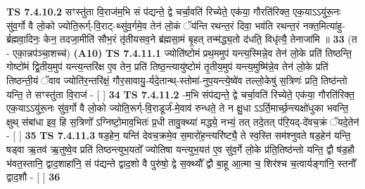 \documentclass[17pt]{extarticle}
\begin{document}
                  \newline
                                \textbf{ TS 7.4.10.2} \newline
                  सꣳस्तु॑ता वि॒राज॑म॒भि सं प॑द्यन्ते॒ द्वे चर्चा॒वति॑ रिच्येते॒ एक॑या॒ गौरति॑रिक्त॒ एक॒याऽऽयु॑रू॒नः सु॑व॒र्गो वै लो॒को ज्योति॒रूर्ग्-वि॒राट्-थ्सु॑व॒र्गमे॒व तेन॑ लो॒कं ॅय॑न्ति रथन्त॒रं दिवा॒ भव॑ति रथन्त॒रं नक्त॒मित्या॑हु-र्ब्रह्मवा॒दिनः॒ केन॒ तदजा॒मीति॑ सौभ॒रं तृ॑तीयसव॒ने ब्र॑ह्मसा॒मं बृ॒हत् तन्म॑द्ध्य॒तो द॑धति॒ विधृ॑त्यै॒ तेनाजा॑मि ॥ \textbf{  33} \newline
                  \newline
                      (त - एका॒न्नप॑ञ्चा॒शच्च॑)  \textbf{(A10)} \newline \newline
                                        \textbf{ TS 7.4.11.1} \newline
                  ज्योति॑ष्टोमं प्रथ॒ममुप॑ यन्त्य॒स्मिन्ने॒व तेन॑ लो॒के प्रति॑ तिष्ठन्ति॒ गोष्टो॑मं द्वि॒तीय॒मुप॑ यन्त्य॒न्तरि॑क्ष ए॒व तेन॒ प्रति॑ तिष्ठ॒न्त्यायु॑ष्टोमं तृ॒तीय॒मुप॑ यन्त्य॒मुष्मि॑न्ने॒व तेन॑ लो॒के प्रति॑ तिष्ठन्ती॒यं ॅवाव ज्योति॑र॒न्तरि॑क्षं॒ गौर॒सावायु॒-र्यदे॒तान्थ्-स्तोमा॑-नुप॒यन्त्ये॒ष्वे॑व तल्लो॒केषु॑ स॒त्रिणः॑ प्रति॒ तिष्ठ॑न्तो यन्ति॒ ते सꣳस्तु॑ता वि॒राज॑ - [  ] \textbf{  34} \newline
                  \newline
                                \textbf{ TS 7.4.11.2} \newline
                  -म॒भि संप॑द्यन्ते॒ द्वे चर्चा॒वति॑ रिच्येते॒ एक॑या॒ गौरति॑रिक्त॒ एक॒याऽऽयु॑रू॒नः सु॑व॒र्गो वै लो॒को ज्योति॒रूर्ग्-वि॒राडूर्ज॑-मे॒वाव॑ रुन्धते॒ ते न क्षु॒धा ऽऽर्ति॒मार्च्छ॒न्त्यक्षो॑धुका भवन्ति॒ क्षुथ् स॑बांधा इव॒ हि स॒त्रिणो᳚ ऽग्निष्टो॒माव॒भितः॑ प्र॒धी तावु॒क्थ्या॑ मद्ध्ये॒ नभ्यं॒ तत् तदे॒तत् प॑रि॒यद्-दे॑वच॒क्रं ॅयदे॒तेन॑ - [  ] \textbf{  35} \newline
                  \newline
                                \textbf{ TS 7.4.11.3} \newline
                  षड॒हेन॒ यन्ति॑ देवच॒क्रमे॒व स॒मारो॑ह॒न्त्यरि॑ष्ट्यै॒ ते स्व॒स्ति सम॑श्नुवते षड॒हेन॑ यन्ति॒ षड्वा ऋ॒तव॑ ऋ॒तुष्वे॒व प्रति॑ तिष्ठन्त्युभ॒यतो᳚ ज्योतिषा यन्त्युभ॒यत॑ ए॒व सु॑व॒र्गे लो॒के प्र॑ति॒तिष्ठ॑न्तो यन्ति॒ द्वौ ष॑ड॒हौ भ॑वत॒स्तानि॒ द्वाद॒शाहा॑नि॒ सं प॑द्यन्ते द्वाद॒शो वै पुरु॑षो॒ द्वे स॒क्थ्यौ᳚ द्वौ बा॒हू आ॒त्मा च॒ शिर॑श्च च॒त्वार्यङ्गा॑नि॒ स्तनौ᳚ द्वाद॒शौ - [  ] \textbf{  36} \newline
                  \newline
\end{document}
